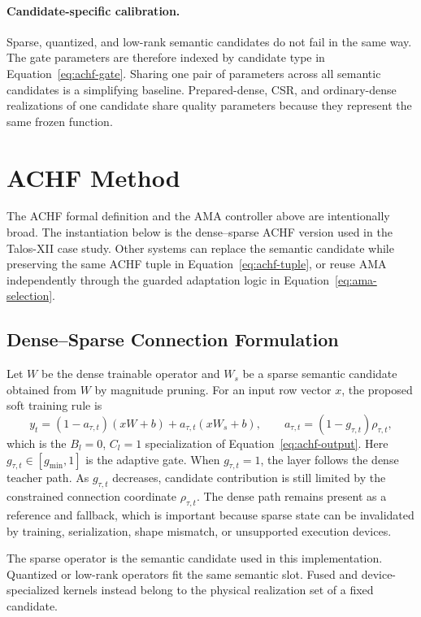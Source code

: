 \documentclass{article}
\newcommand{\ama}{\textsc{AMA}}
\begin{document}
\paragraph{Candidate-specific calibration.}
Sparse, quantized, and low-rank semantic candidates do not
fail in the same way. The gate parameters are therefore indexed by candidate
type in Equation~\eqref{eq:achf-gate}. Sharing one pair of parameters across
all semantic candidates is a simplifying baseline. Prepared-dense, CSR, and
ordinary-dense realizations of one candidate share quality parameters because
they represent the same frozen function.

\section{ACHF Method}
\label{sec:method}

The ACHF formal definition and the \ama{} controller above are intentionally broad.
The instantiation below is the dense--sparse ACHF version used in the Talos-XII
case study. Other systems can replace the semantic candidate while preserving the
same ACHF tuple in Equation~\eqref{eq:achf-tuple}, or reuse \ama{} independently
through the guarded adaptation logic in Equation~\eqref{eq:ama-selection}.

\subsection{Dense--Sparse Connection Formulation}

Let $W$ be the dense trainable operator and $W_s$ be a sparse semantic candidate
obtained from $W$ by magnitude pruning. For an input row vector $x$, the proposed
soft training rule is
\begin{equation}
y_t
=(1-a_{\tau,t})(xW+b)+a_{\tau,t}(xW_s+b),
\qquad
a_{\tau,t}=(1-g_{\tau,t})\rho_{\tau,t},
\label{eq:achf-blend}
\end{equation}
which is the $B_l=0$, $C_l=1$ specialization of
Equation~\eqref{eq:achf-output}. Here $g_{\tau,t}\in[g_{\min},1]$ is the adaptive
gate. When $g_{\tau,t}=1$, the layer follows the dense teacher path. As $g_{\tau,t}$
decreases, candidate contribution is still limited by the constrained
connection coordinate $\rho_{\tau,t}$. The dense path remains
present as a reference and fallback, which is important because sparse state can
be invalidated by training, serialization, shape mismatch, or unsupported
execution devices.

The sparse operator is the semantic candidate used in this implementation.
Quantized or low-rank operators fit the same semantic slot. Fused and
device-specialized kernels instead belong to the physical realization set of a
fixed candidate.
\end{document}
